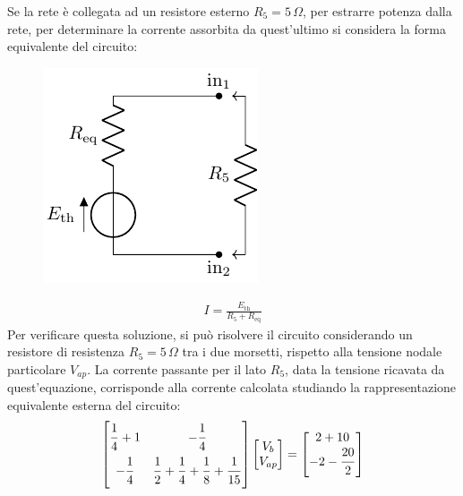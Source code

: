 \documentclass{article}
\numberwithin{equation}{subsection}
\begin{document}
Se la rete è collegata ad un resistore esterno $R_5=5\,\Omega$, per estrarre potenza dalla rete, per determinare la corrente assorbita da quest'ultimo si considera la forma equivalente 
del circuito:
\begin{figure}[H]%
    \centering
    \includegraphics{circuito-8-carico.pdf}%
    \label{fig:circuito-8-carico}
\end{figure}
\begin{gather*}
    I=\displaystyle\frac{E_\mathrm{th}}{R_5+R_\mathrm{eq}}
\end{gather*}
Per verificare questa soluzione, si può risolvere il circuito considerando un resistore di resistenza $R_5=5\,\Omega$ tra i due morsetti, rispetto alla tensione nodale 
particolare $V_{ap}$. La corrente passante per il lato $R_5$, data la tensione ricavata da quest'equazione, corrisponde alla corrente calcolata studiando la rappresentazione 
equivalente esterna del circuito:
\begin{gather*}
    \begin{bmatrix}
        \displaystyle\frac{\strut 1}{\strut 4}+1&-\displaystyle\frac{\strut 1}{\strut 4}\\
        \displaystyle-\frac{\strut 1}{\strut 4}&\displaystyle\frac{\strut 1}{\strut 2}+\frac{\strut 1}{\strut 4}+\frac{\strut 1}{\strut 8}+\frac{\strut 1}{\strut 15}
    \end{bmatrix}\begin{bmatrix}
        V_b\\
        V_{ap}
    \end{bmatrix}=\begin{bmatrix}
        2+10\\
        -2-\displaystyle\frac{\strut 20}{\strut 2}
    \end{bmatrix}
\end{gather*}
\end{document}
